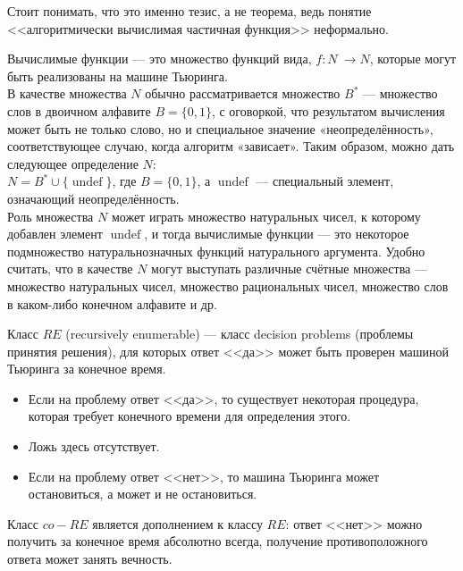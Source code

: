     \begin{Rem}
        Стоит понимать, что это именно тезис, а не теорема, ведь понятие <<алгоритмически вычислимая частичная функция>> неформально.
    \end{Rem}
    \begin{Def} Вычислимые функции — это множество функций         вида, $ f \colon N\ \to N $, которые могут быть реализованы на машине          Тьюринга.\\
        В качестве множества $N$ обычно рассматривается множество $B^{*}$ — множество слов в двоичном алфавите $B = \{0,1\}$, с оговоркой, что результатом вычисления может быть не только слово, но и специальное значение «неопределённость», соответствующее случаю, когда алгоритм «зависает». Таким образом, можно дать следующее определение $N$:\\
        $N=B^{*}\cup \{\operatorname{undef} \}$, где $B=\{0,1\}$, а $\operatorname{undef}$ — специальный элемент, означающий неопределённость.\\
        Роль множества $N$ может играть множество натуральных чисел, к которому добавлен элемент $ \operatorname{undef} $, и тогда вычислимые функции --- это некоторое подмножество натуральнозначных функций натурального аргумента. Удобно считать, что в качестве $N$ могут выступать различные счётные множества --- множество натуральных чисел, множество рациональных чисел, множество слов в каком-либо конечном алфавите и др. 
    \end{Def}
    \begin{Def}[Классы $RE$ и $co-RE$]
        Класс $RE$ (recursively enumerable) --- класс decision problems (проблемы принятия решения), для которых ответ <<да>> может быть проверен машиной Тьюринга за конечное время.
        \begin{itemize}
            \item Если на проблему ответ <<да>>, то существует некоторая процедура, которая требует конечного времени для определения этого.
            \item Ложь здесь отсутствует.
            \item Если на проблему ответ <<нет>>, то машина Тьюринга может остановиться, а может и не остановиться.
        \end{itemize}
        Класс $co-RE$ является дополнением к классу $RE$: ответ <<нет>> можно получить за конечное время абсолютно всегда, получение противоположного ответа может занять вечность.
    \end{Def}
